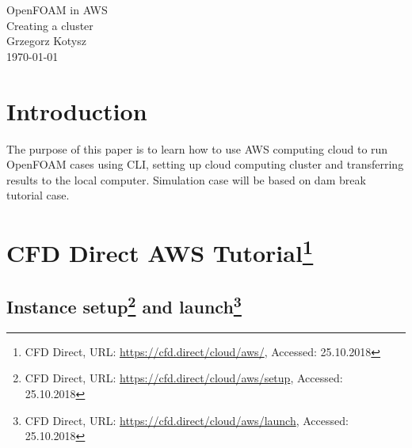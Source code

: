 \documentclass[11pt,english]{article}
\begin{document}
	\begin{titlepage}
		\centering
		\hspace{0pt}
		\vfill
		\Huge{OpenFOAM in AWS} \\
		\medskip
		\huge{Creating a cluster} \\
		\bigskip
		\bigskip
		\Large{Grzegorz Kotysz} \\
		\bigskip
		\bigskip
		\today
		\vfill
		\hspace{0pt}
	\end{titlepage}
\newpage{}

\tableofcontents{}

\newpage{}

\section{Introduction}

The purpose of this paper is to learn how to use AWS computing cloud to run OpenFOAM cases using CLI, setting up cloud computing cluster and transferring results to the local computer. Simulation case will be based on dam break tutorial case.

\section{\texorpdfstring{CFD Direct AWS Tutorial\footnote{CFD Direct, URL: \url{https://cfd.direct/cloud/aws/}, Accessed: 25.10.2018}}{CFD Direct AWS Tutorial}}

\subsection{\texorpdfstring{Instance setup\footnote{CFD Direct, URL: \url{https://cfd.direct/cloud/aws/setup}, Accessed: 25.10.2018} and launch\footnote{CFD Direct, URL: \url{https://cfd.direct/cloud/aws/launch}, Accessed: 25.10.2018}}{Instance Setup}}
\end{document}
